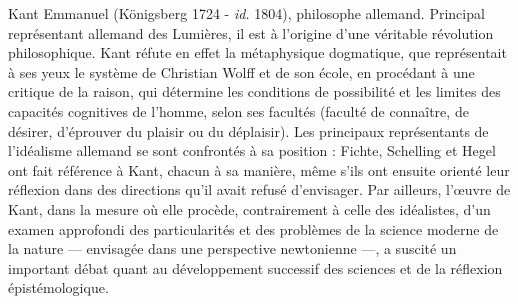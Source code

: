 
Kant Emmanuel (Königsberg 1724 - {\it id.}
1804), philosophe allemand. Principal
représentant allemand des Lumières, il
est à l’origine d’une véritable révolution
philosophique. Kant réfute en effet la
métaphysique dogmatique, que représentait
à ses yeux le système de Christian
Wolff et de son école, en procédant à une
critique de la raison, qui détermine les
conditions de possibilité et les limites des
capacités cognitives de l’homme, selon ses
facultés (faculté de connaître, de désirer,
d’éprouver du plaisir ou du déplaisir). Les
principaux représentants de l’idéalisme
allemand se sont confrontés à sa position :
Fichte, Schelling et Hegel ont fait référence
à Kant, chacun à sa manière, même
s’ils ont ensuite orienté leur réflexion
dans des directions qu’il avait refusé d’envisager.
Par ailleurs, l’œuvre de Kant,
dans la mesure où elle procède, contrairement
à celle des idéalistes, d’un examen
approfondi des particularités et des problèmes
de la science moderne de la nature
— envisagée dans une perspective newtonienne —,
a suscité un important débat
quant au développement successif des
sciences et de la réflexion épistémologique.
